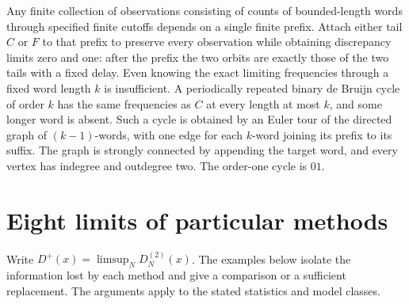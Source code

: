 \documentclass[11pt]{article}
\begin{document}
Any finite collection of observations consisting of counts of bounded-length words through specified finite cutoffs depends on a single finite prefix. Attach either tail \(C\) or \(F\) to that prefix to preserve every observation while obtaining discrepancy limits zero and one: after the prefix the two orbits are exactly those of the two tails with a fixed delay. Even knowing the exact limiting frequencies through a fixed word length \(k\) is insufficient. A periodically repeated binary de Bruijn cycle of order \(k\) has the same frequencies as \(C\) at every length at most \(k\), and some longer word is absent. Such a cycle is obtained by an Euler tour of the directed graph of \((k-1)\)-words, with one edge for each \(k\)-word joining its prefix to its suffix. The graph is strongly connected by appending the target word, and every vertex has indegree and outdegree two. The order-one cycle is \(01\).

\section{Eight limits of particular methods}\label{sec:methods}

Write \(D^+(x)=\limsup_N D_N^{(2)}(x)\). The examples below isolate the information lost by each method and give a comparison or a sufficient replacement. The arguments apply to the stated statistics and model classes.
\end{document}
